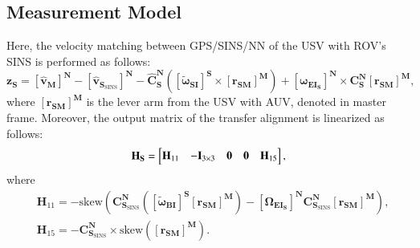 \documentclass[3p]{elsarticle}
\begin{document}
\subsection{Measurement Model}
\noindent Here, the velocity matching between GPS/SINS/NN of the USV with ROV's SINS is performed as follows:
\begin{equation}\label{meas_vec_TA}
{{\mathbf{z}}_{{\mathbf{S}}}} = {\left[{\hat{\mathbf v}}_{\mathbf{M}}\right]}^{\mathbf{N}} - {\left[{\hat{\mathbf v}}_{\mathbf{S}_{\text{SINS}}}\right]}^{\mathbf{N}} - {\hat{\mathbf C}}_{\mathbf{S}}^{\mathbf{N}}\left( {{\left[{\tilde{\boldsymbol{\omega}}}_{{\mathbf{SI}}}\right]}^{\mathbf{S}}\times{\left[{{\mathbf{r}}_{{\mathbf{SM}}}}\right]}^{\mathbf{M}}} \right) + {\left[{\boldsymbol{ \omega }}_{{\mathbf{EI}}_{\mathbf{S}}}\right]}^{\mathbf{N}} \times
{\mathbf{ C}}_{\mathbf{S}}^{\mathbf{N}}{\left[{{\mathbf{r}}_{{\mathbf{SM}}}}\right]}^{\mathbf{M}},
\end{equation}
where \({\left[{{\mathbf{r}}_{{\mathbf{SM}}}}\right]}^{\mathbf{M}}\) is the lever arm from the USV with AUV, denoted in master frame. Moreover, the output matrix of the transfer alignment is linearized as follows:
\begin{equation}\label{HTA_model}
	{{\mathbf{H}}_{{\mathbf{S}}}} = \begin{bmatrix}
		{{{\mathbf{H}}_{{\rm{11}}}}} & { - {{\mathbf{I}}_{3 \times 3}}} & {{\mathbf{0}}} & {{\mathbf{0}}} & {{{\mathbf{H}}_{{\rm{15}}}}}
	\end{bmatrix},
\end{equation}
where
\begin{align}
   & {{\mathbf{H}}_{{{11}}}} =  -  \textrm{skew}{\left({ {{\mathbf{C}}_{\mathbf{S}_{\text{SINS}}}^{\mathbf{N}}\left( {{\left[{\boldsymbol{\tilde \omega }}_{{\mathbf{BI}}}\right]}^{\mathbf{S}}{{\left[{{\mathbf{r}}_{\mathbf{SM}}}\right]}^{\mathbf{M}}}} \right) - {\left[{\boldsymbol{\Omega }}_{{\mathbf{EI}}_{\mathbf{S}}}\right]}^{\mathbf{N}}{\mathbf{ C}}_{\mathbf{S}_{\text{SINS}}}^{\mathbf{N}}}  {{{\left[{{\mathbf{r}}_{\mathbf{SM}}}\right]}^{\mathbf{M}}}  } }\right)},\\
& {{\mathbf{H}}_{{{15}}}} =  - {\mathbf{ C}}_{\mathbf{S}_{\text{SINS}}}^{\mathbf{N}} \times \textrm{skew}\!\left(
	{{{\left[{{\mathbf{r}}_{\mathbf{SM}}}\right]}^{\mathbf{M}}}  }
\right).
\end{align}
\end{document}
